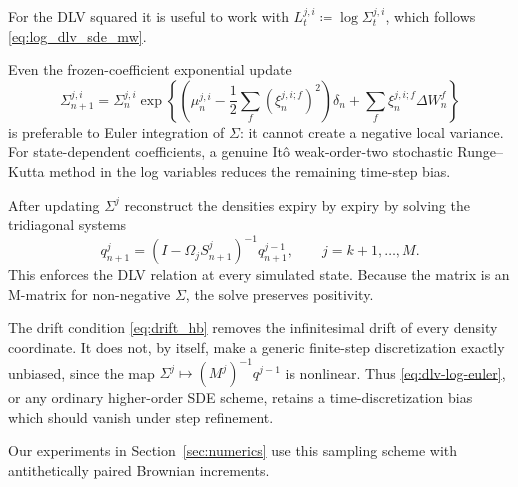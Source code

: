 \documentclass[smallextended,envcountsame,envcountsect]{svjour3}
\begin{document}
  For the DLV squared it is useful to work with
  $L_t^{j,i}\coloneqq\log\Sigma_t^{j,i}$, which follows \eqref{eq:log_dlv_sde_mw}. 

  Even the frozen-coefficient exponential update
  \begin{equation}
    \label{eq:dlv-log-euler}
    \Sigma_{n+1}^{j,i}
      =\Sigma_n^{j,i}\exp\!\left\{
        \left(\mu_n^{j,i}
          -\frac12\sum_f(\xi_n^{j,i;f})^2\right)\delta_n
        +\sum_f\xi_n^{j,i;f}\Delta W_n^f
      \right\}
  \end{equation}
  is preferable to Euler integration of $\Sigma$: it cannot create a negative
  local variance. For state-dependent coefficients, a genuine It\^o
  weak-order-two stochastic Runge--Kutta method in the log variables reduces
  the remaining time-step bias.

  After updating $\Sigma^{j}$ reconstruct the densities expiry by expiry by
  solving the tridiagonal systems
  \begin{equation}
    \label{eq:density-algebraic-step}
    q_{n+1}^{j}
      =\left(I-\Omega_jS_{n+1}^{j}\right)^{-1}q_{n+1}^{j-1},
    \qquad j=k+1,\ldots,M.
  \end{equation}
  This enforces the DLV relation at every simulated state. Because the matrix
  is an M-matrix for non-negative $\Sigma$, the solve preserves positivity.

  The drift condition \eqref{eq:drift_hb} removes the infinitesimal drift of
  every density coordinate. It does not, by itself, make a generic finite-step
  discretization exactly unbiased, since the map
  $\Sigma^j\mapsto(M^j)^{-1}q^{j-1}$ is nonlinear. Thus
  \eqref{eq:dlv-log-euler}, or any ordinary higher-order SDE scheme, retains a
  time-discretization bias which should vanish under step refinement.

  Our experiments in Section~\ref{sec:numerics} use this sampling scheme with antithetically paired Brownian increments.
\end{document}
